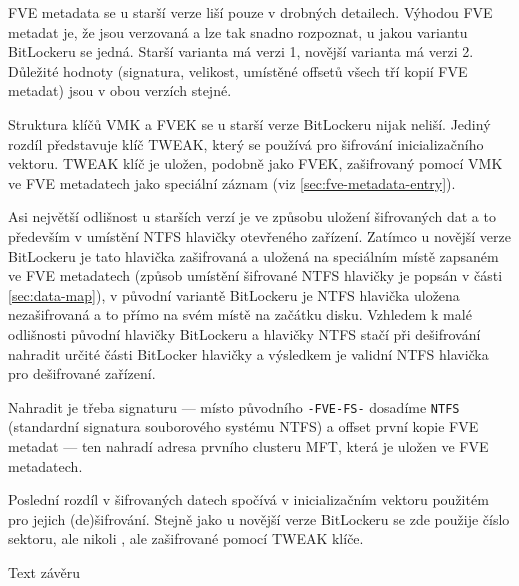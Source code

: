 
FVE metadata se u starší verze liší pouze v drobných detailech. Výhodou FVE metadat je, že jsou verzovaná a lze tak snadno rozpoznat, u jakou variantu BitLockeru se jedná. Starší varianta má verzi 1, novější varianta má verzi 2. Důležité hodnoty (signatura, velikost, umístěné offsetů všech tří kopií FVE metadat) jsou v obou verzích stejné.


Struktura klíčů VMK a FVEK se u starší verze BitLockeru nijak neliší. Jediný rozdíl představuje  klíč TWEAK, který se používá pro šifrování inicializačního vektoru. TWEAK klíč je uložen, podobně jako FVEK, zašifrovaný pomocí VMK ve FVE metadatech jako speciální záznam (viz \ref{sec:fve-metadata-entry}).


Asi největší odlišnost u starších verzí je ve způsobu uložení šifrovaných dat a to především v umístění NTFS hlavičky otevřeného zařízení. Zatímco u novější verze BitLockeru je tato hlavička zašifrovaná a uložená na speciálním místě zapsaném ve FVE metadatech (způsob umístění šifrované NTFS hlavičky je popsán v části \ref{sec:data-map}), v původní variantě BitLockeru je NTFS hlavička uložena nezašifrovaná a to přímo na svém  místě na začátku disku. Vzhledem k malé odlišnosti původní hlavičky BitLockeru a hlavičky NTFS stačí při dešifrování nahradit určité části BitLocker hlavičky a výsledkem je validní NTFS hlavička pro dešifrované zařízení. 

Nahradit je třeba signaturu --- místo původního \texttt{-FVE-FS-} dosadíme \texttt{NTFS} (standardní signatura souborového systému NTFS) a offset první kopie FVE metadat --- ten nahradí adresa prvního clusteru MFT, která je uložen ve FVE metadatech.

Poslední rozdíl v šifrovaných datech spočívá v inicializačním vektoru použitém pro jejich (de)šifrování. Stejně jako u novější verze BitLockeru se zde použije číslo sektoru, ale nikoli , ale zašifrované pomocí TWEAK klíče.









Text závěru


